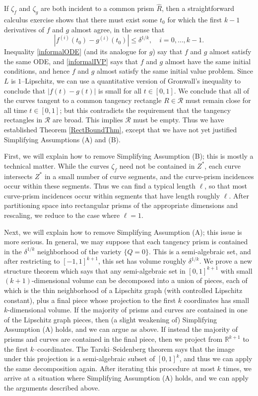 \documentclass[letterpaper, reqno,11pt]{article}
\numberwithin{equation}{section}
\newcommand{\RR}{\mathbb{R}}
\numberwithin{thm}{section}
\theoremstyle{remark}
\begin{document}
If $\zeta_f$ and $\zeta_g$ are both incident to a common prism $\hat R$, then a straightforward calculus exercise shows that there must exist some $t_0$ for which the first $k-1$ derivatives of $f$ and $g$ almost agree, in the sense that
\begin{equation}\label{informalIVP}
|f^{(i)}(t_0) - g^{(i)}(t_0)|\leq\delta^{1/k},\quad i=0,\ldots,k-1.
\end{equation}
Inequality \eqref{informalODE} (and its analogue for $g$) say that $f$ and $g$ almost satisfy the same ODE, and \eqref{informalIVP} says that $f$ and $g$ almost have the same initial conditions, and hence $f$ and $g$ almost satisfy the same initial value problem. Since $L$ is $1$--Lipschitz, we can use a quantitative version of Gronwall's inequality to conclude that $|f(t)-g(t)|$ is small for all $t\in [0,1]$. We conclude that all of the curves tangent to a common tangency rectangle $R\in\mathcal{R}$ must remain close for all time $t\in [0,1]$; but this contradicts the requirement that the tangency rectangles in $\mathcal{R}$ are broad. This implies $\mathcal{R}$ must be empty. Thus we have established Theorem \ref{RectBoundThm}, except that we have not yet justified Simplifying Assumptions (A) and (B). 

First, we will explain how to remove Simplifying Assumption (B); this is mostly a technical matter. While the curves $\zeta_f$ need not be contained in $Z^*$, each curve intersects $Z^*$ in a small number of curve segments, and the curve-prism incidences occur within these segments. Thus we can find a typical length $\ell$, so that most curve-prism incidences occur within segments that have length roughly $\ell$. After partitioning space into rectangular prisms of the appropriate dimensions and rescaling, we reduce to the case where $\ell=1$. 

Next, we will explain how to remove Simplifying Assumption (A); this issue is more serious. In general, we may suppose that each tangency prism is contained in the $\delta^{1/k}$ neighborhood of the variety $\{Q=0\}$. This is a semi-algebraic set, and after restricting to $[-1,1]^{k+1}$, this set has volume roughly $\delta^{1/k}$. We prove a new structure theorem which says that any semi-algebraic set in $[0,1]^{k+1}$ with small $(k+1)$-dimensional volume can be decomposed into a union of pieces, each of which is the thin neighborhood of a Lipschitz graph (with controlled Lipschitz constant), plus a final piece whose projection to the first $k$ coordinates has small $k$-dimensional volume. If the majority of prisms and curves are contained in one of the Lipschitz graph pieces, then (a slight weakening of) Simplifying Assumption (A) holds, and we can argue as above. If instead the majority of prisms and curves are contained in the final piece, then we project from $\RR^{k+1}$ to the first $k$--coordinates. The Tarski–Seidenberg theorem says that the image under this projection is a semi-algebraic subset of $[0,1]^k$, and thus we can apply the same decomposition again. After iterating this procedure at most $k$ times, we arrive at a situation where Simplifying Assumption (A) holds, and we can apply the arguments described above.
\end{document}
